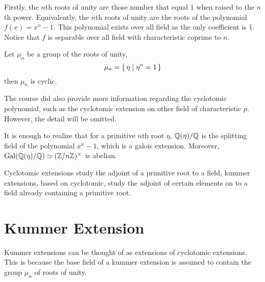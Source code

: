 \documentclass{article}
\begin{document}
  Firstly, the $n$th roots of unity are those number that equal $1$ when raised to the $n$th power. Equivalently, the $n$th roots of 
  unity are the roots of the polynomial $f(x) = x^n - 1$. This polynomial exists over all field as the only coefficient is 1.
  Notice that $f$ is separable over all field with characteristic coprime to $n$. 

  Let $\mu_n$ be a group of the roots of unity, \[ \mu_n = \set{\eta \mid \eta^n = 1} \]
  then $\mu_n$ is cyclic.


  The course did also provide more information regarding the cyclotomic polynomial, such as the cyclotomic extension on other field 
  of characteristic $p$. However, the detail will be omitted.

  It is enough to realize that for a primitive $n$th root $\eta$, $\Rat(\eta)/\Rat$ is the splitting field of the polynomial $x^n - 1$, 
  which is a galois extension. Moreover, $\Gal(\Rat(\eta) / \Rat) \isom (\ZMod[n])^\times$ is abelian.

  Cyclotomic extensions study the adjoint of a primitive root to a field, kummer extensions, based on cyclotomic, study the adjoint 
  of certain elements on to a field already containing a primitive root.

  \clearpage
  \section{Kummer Extension}
  
  Kummer extensions can be thought of as extensions of cyclotomic extensions. This is because the base field of a kummer extension 
  is assumed to contain the group $\mu_n$ of roots of unity.

\end{document}
